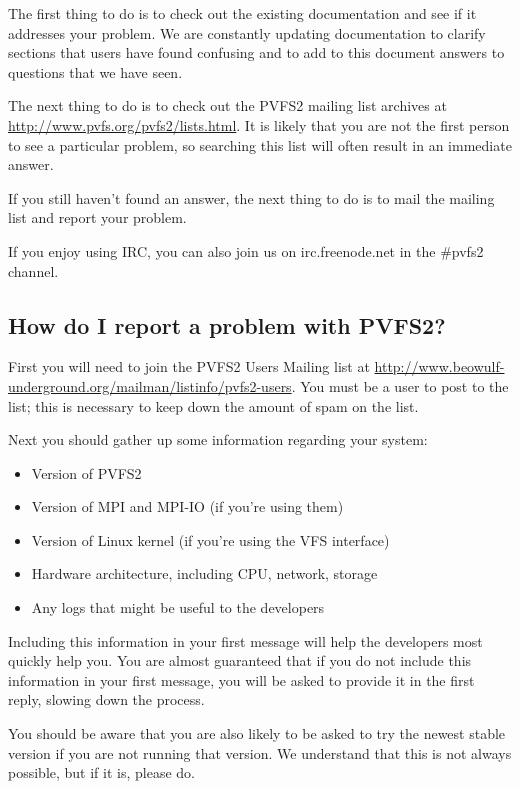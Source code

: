 \documentclass[11pt,letterpaper]{article}
\begin{document}
The first thing to do is to check out the existing documentation and see if it
addresses your problem.  We are constantly updating documentation to clarify
sections that users have found confusing and to add to this document answers
to questions that we have seen.

The next thing to do is to check out the PVFS2 mailing list archives at
\url{http://www.pvfs.org/pvfs2/lists.html}.  It is likely that you are not
the first person to see a particular problem, so searching this list will
often result in an immediate answer.

If you still haven't found an answer, the next thing to do is to mail the
mailing list and report your problem.

If you enjoy using IRC, you can also join us on irc.freenode.net in
the \#pvfs2 channel.

\subsection{How do I report a problem with PVFS2?}

First you will need to join the PVFS2 Users Mailing list at
\url{http://www.beowulf-underground.org/mailman/listinfo/pvfs2-users}.  You
must be a user to post to the list; this is necessary to keep down the amount
of spam on the list.

Next you should gather up some information regarding your system:
\begin{itemize}
\item Version of PVFS2
\item Version of MPI and MPI-IO (if you're using them)
\item Version of Linux kernel (if you're using the VFS interface)
\item Hardware architecture, including CPU, network, storage
\item Any logs that might be useful to the developers
\end{itemize}
Including this information in your first message will help the developers most
quickly help you.  You are almost guaranteed that if you do not include this
information in your first message, you will be asked to provide it in the
first reply, slowing down the process.

You should be aware that you are also likely to be asked to try the newest
stable version if you are not running that version.  We understand that this
is not always possible, but if it is, please do.
\end{document}
